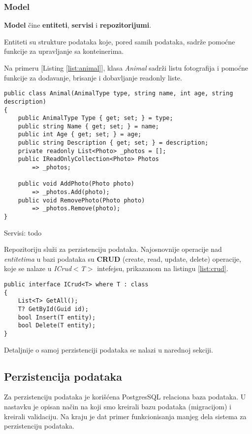 \subsubsection*{Model}
\par \textbf{Model} čine \textbf{entiteti}, \textbf{servisi} i \textbf{repozitorijumi}. 
\par Entiteti su strukture podataka koje, pored samih podataka, sadrže pomoćne funkcije za upravljanje sa konteinerima. 
\par Na primeru [Listing \ref{list:animal}], klasa \textit{Animal} sadrži listu fotografija i pomoćne funkcije za dodavanje, brisanje i dobavljanje
readonly liste.
\begin{lstlisting}[caption={Primer entiteta}, captionpos=b, label=list:animal]
public class Animal(AnimalType type, string name, int age, string description)
{
    public AnimalType Type { get; set; } = type;
    public string Name { get; set; } = name;
    public int Age { get; set; } = age;
    public string Description { get; set; } = description;
    private readonly List<Photo> _photos = [];
    public IReadOnlyCollection<Photo> Photos 
        => _photos;

    public void AddPhoto(Photo photo) 
        => _photos.Add(photo);
    public void RemovePhoto(Photo photo) 
        => _photos.Remove(photo);
}
\end{lstlisting}
\par Servisi: todo
\par Repozitoriju služi za perzistenciju podataka. Najosnovnije operacije nad \textit{entitetima} u bazi podataka su \textbf{CRUD} (create, read, update, delete) 
operacije, koje se nalaze u \textit{ICrud$<$T$>$} intefejsu, prikazanom na listingu \ref{list:crud}.
\begin{lstlisting}[caption={ICrud$<$T$>$ interfejs}, captionpos=b, label={list:crud}]
public interface ICrud<T> where T : class
{
    List<T> GetAll();
    T? GetById(Guid id);
    bool Insert(T entity);
    bool Delete(T entity);
}
\end{lstlisting}
\par Detaljnije o samoj perzistenciji podataka se nalazi u narednoj sekciji.
\subsection{Perzistencija podataka}
\par Za perzistenciju podataka je korišćena PostgresSQL relaciona baza podataka. U nastavku je opisan način na koji smo kreirali bazu podataka (migracijom)
i kreirali validaciju. Na kraju je dat primer funkcionisanja manjeg dela sistema za perzistenciju podataka.
